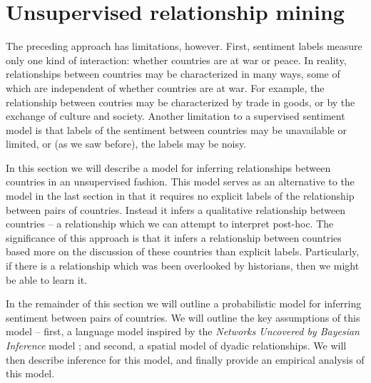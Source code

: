 \section*{Unsupervised relationship mining}


The preceding approach has limitations, however.  First, sentiment
labels measure only one kind of interaction: whether countries are at
war or peace.  In reality, relationships between countries may be
characterized in many ways, some of which are independent of whether
countries are at war.  For example, the relationship between coutries
may be characterized by trade in goods, or by the exchange of culture
and society. Another limitation to a supervised sentiment model is
that labels of the sentiment between countries may be unavailable or
limited, or (as we saw before), the labels may be noisy.

In this section we will describe a model for inferring relationships
between countries in an unsupervised fashion.  This model serves as an
alternative to the model in the last section in that it requires no
explicit labels of the relationship between pairs of countries.
Instead it infers a qualitative relationship between countries -- a
relationship which we can attempt to interpret post-hoc.  The
significance of this approach is that it infers a relationship between
countries based more on the discussion of these countries than
explicit labels.  Particularly, if there is a relationship which was
been overlooked by historians, then we might be able to learn it.

In the remainder of this section we will outline a probabilistic model
for inferring sentiment between pairs of countries.  We will outline
the key assumptions of this model -- first, a language model inspired
by the \emph{Networks Uncovered by Bayesian Inference} model
\cite{chang:2009nubbi}; and second, a spatial model of dyadic
relationships. We will then describe inference for this model, and
finally provide an empirical analysis of this model.

